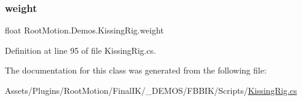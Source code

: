 \mbox{\label{class_root_motion_1_1_demos_1_1_kissing_rig_a687c2a0ee27e71c487681e4f81eb41c7}} 
\subsubsection{\texorpdfstring{weight}{weight}}
{\footnotesize\ttfamily float Root\+Motion.\+Demos.\+Kissing\+Rig.\+weight}



Definition at line 95 of file Kissing\+Rig.\+cs.



The documentation for this class was generated from the following file\+:\begin{DoxyCompactItemize}
\item 
Assets/\+Plugins/\+Root\+Motion/\+Final\+I\+K/\+\_\+\+D\+E\+M\+O\+S/\+F\+B\+B\+I\+K/\+Scripts/\mbox{\hyperlink{_kissing_rig_8cs}{Kissing\+Rig.\+cs}}\end{DoxyCompactItemize}

